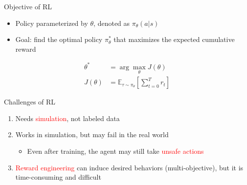 \documentclass[8pt, aspectratio=169]{beamer} %
\begin{document}
\begin{frame}{\insertsubsectionhead}{Objective of RL}
  \begin{itemize}
    \item Policy parameterized by $\theta$, denoted as $\pi_\theta(a|s)$
    \item Goal: find the optimal policy $\pi^*_\theta$ that maximizes the expected cumulative reward
  \end{itemize}

  \begin{equation}
    \begin{aligned}
      \theta^* &= \arg\max_\theta J(\theta) \\
      J(\theta) &= \mathbb{E}_{\tau \sim \pi_\theta} \left[\sum^T_{t = 0} r_t \right]
    \end{aligned}
  \end{equation}

\end{frame}


\begin{frame}{\insertsubsectionhead}{Challenges of RL}

  \begin{enumerate}
    \item<1-> Needs \textcolor{red}{simulation}, not labeled data
    \item<2-> Works in simulation, but may fail in the real world
      \begin{itemize}
        \item<2-> Even after training, the agent may still take \textcolor{red}{unsafe actions}
      \end{itemize}
    \item<3-> \textcolor{red}{Reward engineering} can induce desired behaviors (multi-objective), but it is time-consuming and difficult
  \end{enumerate}

\end{frame}


\end{document}

